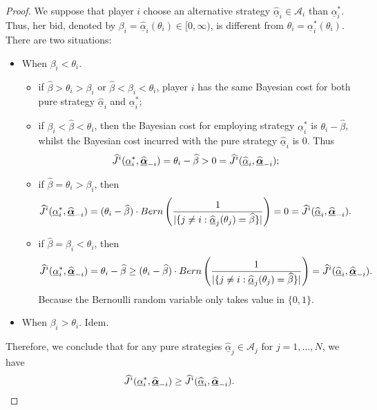 \begin{proof}
	We suppose that player $i$ choose an alternative strategy $\hat{\underline{\alpha}}_i \in \mathcal{A}_i$ than $\underline{\alpha}_i^*$. Thus, her bid, denoted by $\beta_i = \hat{\underline{\alpha}}_i(\theta_i) \in [0, \infty)$, is different from $\theta_i = \underline{\alpha}_i^*(\theta_i)$. 
	There are two situations:
	\begin{itemize}
		\item When $\beta_i < \theta_i$. 
		\begin{itemize}
			\item	if $\hat{\beta} > \theta_i > \beta_i$ or $\hat{\beta}< \beta_i < \theta_i$, player $i$ has the same Bayesian cost for both pure strategy $\hat{\underline{\alpha}}_i$ and $\underline{\alpha}_i^*$;
			\item  if $\beta_i < \hat{\beta} < \theta_i$, then the Bayesian cost for employing strategy $\underline{\alpha}_i^*$ is $\theta_i- \hat{\beta}$, whilst the Bayesian cost incurred with the pure strategy $\hat{\underline{\alpha}}_i$ is $0$. Thus
			$$
				\widehat{J}^i(\underline{\alpha}_i^*, \widehat{\underline{\boldsymbol{\alpha}}}_{-i}) = \theta_i - \widehat{\beta} > 0 =  \widehat{J}^i(\widehat{\underline{\alpha}}_i, \widehat{\underline{\boldsymbol{\alpha}}}_{-i});
			$$
			\item if $\hat{\beta} = \theta_i > \beta_i$, then 
			$$
				\widehat{J}^i(\underline{\alpha}_i^*, \widehat{\underline{\boldsymbol{\alpha}}}_{-i}) = (\theta_i-\widehat{\beta}) \cdot Bern\left( \frac{1}{|\{ j\neq i: \widehat{\underline{\alpha}}_j(\theta_j) = \widehat{\beta} \} |} \right) = 0 = \widehat{J}^i(\widehat{\underline{\alpha}}_i, \widehat{\underline{\boldsymbol{\alpha}}}_{-i}).
			$$ 
			\item if $\hat{\beta} = \beta_i < \theta_i$, then
			$$
				\widehat{J}^i(\underline{\alpha}_i^*, \widehat{\underline{\boldsymbol{\alpha}}}_{-i}) =  \theta_i- \widehat{\beta} \geq (\theta_i - \widehat{\beta}) \cdot Bern\left( \frac{1}{|\{ j\neq i: \widehat{\underline{\alpha}}_j(\theta_j) = \widehat{\beta} \} |} \right) = \widehat{J}^i(\widehat{\underline{\alpha}}_i, \widehat{\underline{\boldsymbol{\alpha}}}_{-i}).
			$$
			Because the Bernoulli random variable only takes value in $\{0,1\}$.
		\end{itemize}
		\item When $\beta_i > \theta_i$. Idem.
	\end{itemize}
	Therefore, we conclude that for any pure strategies $\hat{\underline{\alpha}}_j \in \mathcal{A}_j$ for $j=1, \ldots,N$, we have
	$$
		\widehat{J}^i(\underline{\alpha}_i^*, \widehat{\underline{\boldsymbol{\alpha}}}_{-i} ) \geq \widehat{J}^i( \widehat{\underline{\alpha}}_i, \widehat{\underline{\boldsymbol{\alpha}}}_{-i} ).
	$$
\end{proof}



